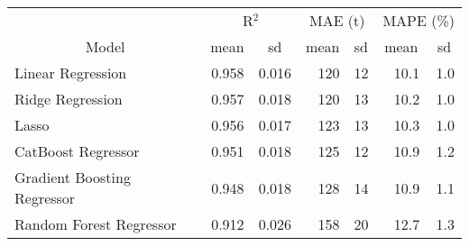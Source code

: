 
\begin{tabular}[t]{lrrrrrr}
\toprule
\multicolumn{1}{c}{ } & \multicolumn{2}{c}{R$^2$} & \multicolumn{2}{c}{MAE (t)} & \multicolumn{2}{c}{MAPE (\%)} \\
\cmidrule(l{3pt}r{3pt}){2-3} \cmidrule(l{3pt}r{3pt}){4-5} \cmidrule(l{3pt}r{3pt}){6-7}
\multicolumn{1}{c}{Model} & \multicolumn{1}{c}{mean} & \multicolumn{1}{c}{sd} & \multicolumn{1}{c}{mean} & \multicolumn{1}{c}{sd} & \multicolumn{1}{c}{mean} & \multicolumn{1}{c}{sd}\\
\midrule
Linear Regression & 0.958 & 0.016 & 120 & 12 & 10.1 & 1.0\\
Ridge Regression & 0.957 & 0.018 & 120 & 13 & 10.2 & 1.0\\
Lasso & 0.956 & 0.017 & 123 & 13 & 10.3 & 1.0\\
CatBoost Regressor & 0.951 & 0.018 & 125 & 12 & 10.9 & 1.2\\
Gradient Boosting Regressor & 0.948 & 0.018 & 128 & 14 & 10.9 & 1.1\\
Random Forest Regressor & 0.912 & 0.026 & 158 & 20 & 12.7 & 1.3\\
\bottomrule
\end{tabular}
